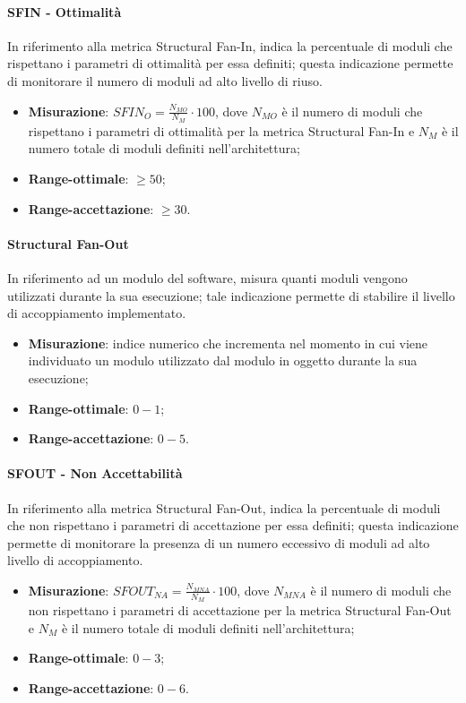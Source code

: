 \paragraph{SFIN - Ottimalità}
\label{sfin-ottimalita}
In riferimento alla metrica Structural Fan-In, indica la percentuale di moduli che rispettano i parametri di ottimalità per essa definiti; questa indicazione permette di monitorare il numero di moduli ad alto livello di riuso.
\begin{itemize}
\item \textbf{Misurazione}: $SFIN_{O}=\frac{N_{MO}}{N_{M}} \cdot 100$, dove $N_{MO}$ è il numero di moduli che rispettano i parametri di ottimalità per la metrica Structural Fan-In e $N_{M}$ è il numero totale di moduli definiti nell'architettura;
\item \textbf{Range-ottimale}: $\geq 50$;
\item \textbf{Range-accettazione}: $\geq 30$.
\end{itemize}
\paragraph{Structural Fan-Out}
\label{SFOUT}
In riferimento ad un modulo del software, misura quanti moduli vengono utilizzati durante la sua esecuzione; tale indicazione permette di stabilire il livello di accoppiamento implementato.
\begin{itemize}
\item \textbf{Misurazione}: indice numerico che incrementa nel momento in cui viene individuato un modulo utilizzato dal modulo in oggetto durante la sua esecuzione;
\item \textbf{Range-ottimale}: $0 - 1$;
\item \textbf{Range-accettazione}: $0 - 5$.
\end{itemize}
\paragraph{SFOUT - Non Accettabilità}
\label{sfout-NonAcc}
In riferimento alla metrica Structural Fan-Out, indica la percentuale di moduli che non rispettano i parametri di accettazione per essa definiti; questa indicazione permette di monitorare la presenza di un numero eccessivo di moduli ad alto livello di accoppiamento.
\begin{itemize}
\item \textbf{Misurazione}: $SFOUT_{NA}=\frac{N_{MNA}}{N_{M}} \cdot 100$, dove $N_{MNA}$ è il numero di moduli che non rispettano i parametri di accettazione per la metrica Structural Fan-Out e $N_{M}$ è il numero totale di moduli definiti nell'architettura;
\item \textbf{Range-ottimale}: $0 - 3$;
\item \textbf{Range-accettazione}: $0 - 6$.
\end{itemize}
